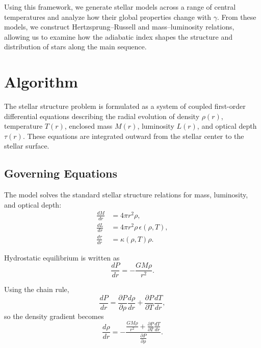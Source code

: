 \documentclass[12pt]{article}
\begin{document}
Using this framework, we generate stellar models across a range of central temperatures and analyze how their global properties change with $\gamma$. From these models, we construct Hertzsprung–Russell and mass–luminosity relations, allowing us to examine how the adiabatic index shapes the structure and distribution of stars along the main sequence.



\clearpage


\section{Algorithm}

The stellar structure problem is formulated as a system of coupled first-order differential equations describing the radial evolution of density $\rho(r)$, temperature $T(r)$, enclosed mass $M(r)$, luminosity $L(r)$, and optical depth $\tau(r)$. These equations are integrated outward from the stellar center to the stellar surface.

\subsection{Governing Equations}

The model solves the standard stellar structure relations for mass, luminosity, and optical depth:
\begin{align}
\frac{dM}{dr} &= 4\pi r^2 \rho, \\
\frac{dL}{dr} &= 4\pi r^2 \rho \, \epsilon(\rho,T), \\
\frac{d\tau}{dr} &= \kappa(\rho,T)\rho.
\end{align}

Hydrostatic equilibrium is written as
\begin{equation}
\frac{dP}{dr} = -\frac{GM\rho}{r^2}.
\end{equation}

Using the chain rule,
\begin{equation}
\frac{dP}{dr}
=
\frac{\partial P}{\partial \rho}\frac{d\rho}{dr}
+
\frac{\partial P}{\partial T}\frac{dT}{dr},
\end{equation}
so the density gradient becomes
\begin{equation}
\frac{d\rho}{dr}
=
-\frac{
\frac{GM\rho}{r^2}
+
\frac{\partial P}{\partial T}\frac{dT}{dr}
}{
\frac{\partial P}{\partial \rho}
}.
\label{eq:drhodr}
\end{equation}
\end{document}
